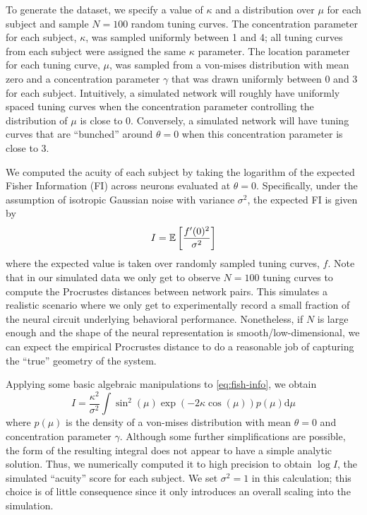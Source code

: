 To generate the dataset, we specify a value of $\kappa$ and a distribution over $\mu$ for each subject and sample $N=100$ random tuning curves.
The concentration parameter for each subject, $\kappa$, was sampled uniformly between 1 and 4; all tuning curves from each subject were assigned the same $\kappa$ parameter.
The location parameter for each tuning curve, $\mu$, was sampled from a von-mises distribution with mean zero and a concentration parameter $\gamma$ that was drawn uniformly between 0 and 3 for each subject.
Intuitively, a simulated network will roughly have uniformly spaced tuning curves when the concentration parameter controlling the distribution of $\mu$ is close to 0.
Conversely, a simulated network will have tuning curves that are ``bunched'' around $\theta=0$ when this concentration parameter is close to 3.

We computed the acuity of each subject by taking the logarithm of the expected Fisher Information (FI) across neurons evaluated at $\theta=0$.
Specifically, under the assumption of isotropic Gaussian noise with variance $\sigma^2$, the expected FI is given by
\begin{equation}
\label{eq:fish-info}
I = \mathbb{E} \left [ \frac{f'(0)^2}{\sigma^2} \right ] 
\end{equation}
where the expected value is taken over randomly sampled tuning curves, $f$.
Note that in our simulated data we only get to observe $N=100$ tuning curves to compute the Procrustes distances between network pairs.
This simulates a realistic scenario where we only get to experimentally record a small fraction of the neural circuit underlying behavioral performance.
Nonetheless, if $N$ is large enough and the shape of the neural representation is smooth/low-dimensional, we can expect the empirical Procrustes distance to do a reasonable job of capturing the ``true'' geometry of the system.

Applying some basic algebraic manipulations to \cref{eq:fish-info}, we obtain
\begin{equation}
I = \frac{\kappa^2}{\sigma^2} \int \sin^2(\mu) \exp(-2\kappa \cos(\mu)) p(\mu) \textrm{d}\mu
\end{equation}
where $p(\mu)$ is the density of a von-mises distribution with mean $\theta=0$ and concentration parameter $\gamma$.
Although some further simplifications are possible, the form of the resulting integral does not appear to have a simple analytic solution.
Thus, we numerically computed it to high precision to obtain $\log I$, the simulated ``acuity'' score for each subject.
We set $\sigma^2 = 1$ in this calculation; this choice is of little consequence since it only introduces an overall scaling into the simulation.


